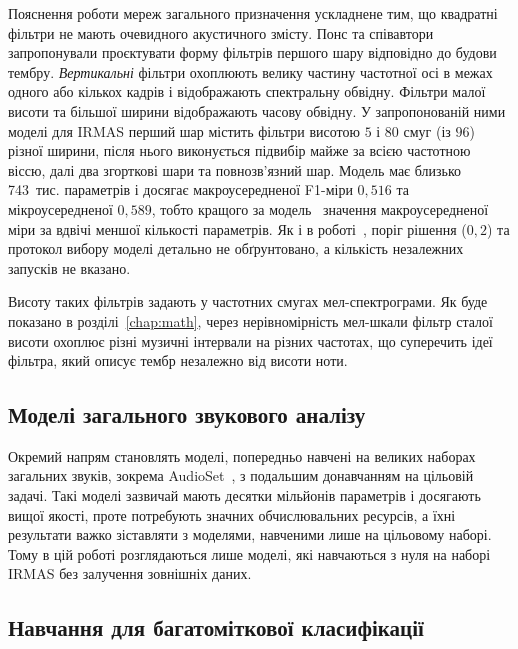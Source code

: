 Пояснення роботи мереж загального призначення ускладнене тим, що квадратні
фільтри не мають очевидного акустичного змісту. Понс та
співавтори~\cite{pons2017} запропонували проєктувати форму фільтрів першого
шару відповідно до будови тембру. \textit{Вертикальні} фільтри охоплюють
велику частину частотної осі в межах одного або кількох кадрів і
відображають спектральну обвідну. Фільтри малої висоти та більшої
ширини відображають часову обвідну. У запропонованій ними моделі для
IRMAS перший шар містить фільтри висотою $5$ і $80$ смуг (із $96$) різної
ширини, після нього виконується підвибір майже за всією частотною віссю,
далі два згорткові шари та повнозв'язний шар. Модель має близько
743~тис. параметрів і досягає макроусередненої F1-міри $0{,}516$ та
мікроусередненої $0{,}589$, тобто кращого за модель~\cite{han2017}
значення макроусередненої міри за вдвічі меншої кількості параметрів. Як
і в роботі~\cite{han2017}, поріг рішення ($0{,}2$) та протокол вибору
моделі детально не обґрунтовано, а кількість незалежних запусків не
вказано.

Висоту таких фільтрів задають у частотних смугах мел-спектрограми. Як буде
показано в розділі~\ref{chap:math}, через нерівномірність мел-шкали
фільтр сталої висоти охоплює різні музичні інтервали на різних частотах,
що суперечить ідеї фільтра, який описує тембр незалежно від висоти ноти.

\subsection{Моделі загального звукового аналізу}

Окремий напрям становлять моделі, попередньо навчені на великих наборах
загальних звуків, зокрема AudioSet~\cite{gemmeke2017,hershey2017,kong2020},
з подальшим донавчанням на цільовій задачі. Такі моделі зазвичай мають
десятки мільйонів параметрів і досягають вищої якості, проте потребують
значних обчислювальних ресурсів, а їхні результати важко зіставляти з
моделями, навченими лише на цільовому наборі. Тому в цій роботі
розглядаються лише моделі, які навчаються з нуля на наборі IRMAS без
залучення зовнішніх даних.

\subsection{Навчання для багатоміткової класифікації}
\label{sec:traingen}

